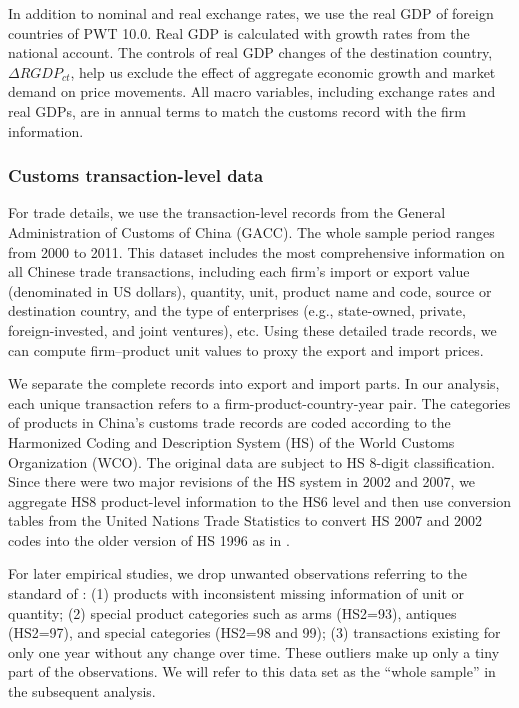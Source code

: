 In addition to nominal and real exchange rates, we use the real GDP of foreign countries of PWT 10.0. Real GDP is calculated with growth rates from the national account. The controls of real GDP changes of the destination country, $\Delta RGDP_{ct}$, help us exclude the effect of aggregate economic growth and market demand on price movements. All macro variables, including exchange rates and real GDPs, are in annual terms to match the customs record with the firm information.

\subsubsection{Customs transaction-level data} \label{Data-Customs}

For trade details, we use the transaction-level records from the General Administration of Customs of China (GACC). The whole sample period ranges from 2000 to 2011. This dataset includes the most comprehensive information on all Chinese trade transactions, including each firm's import or export value (denominated in US dollars), quantity, unit, product name and code, source or destination country, and the type of enterprises (e.g., state-owned, private, foreign-invested, and joint ventures), etc. Using these detailed trade records, we can compute firm–product unit values to proxy the export and import prices.

We separate the complete records into export and import parts. In our analysis, each unique transaction refers to a firm-product-country-year pair. The categories of products in China's customs trade records are coded according to the Harmonized Coding and Description System (HS) of the World Customs Organization (WCO). The original data are subject to HS 8-digit classification. Since there were two major revisions of the HS system in 2002 and 2007, we aggregate HS8 product-level information to the HS6 level and then use conversion tables from the United Nations Trade Statistics to convert HS 2007 and 2002 codes into the older version of HS 1996 as in \cite{fan-li-yeaple2015}.

For later empirical studies, we drop unwanted observations referring to the standard of \cite{lmx2015}: (1) products with inconsistent missing information of unit or quantity; (2) special product categories such as arms (HS2=93), antiques (HS2=97), and special categories (HS2=98 and 99); (3) transactions existing for only one year without any change over time. These outliers make up only a tiny part of the observations. We will refer to this data set as the ``whole sample'' in the subsequent analysis.

